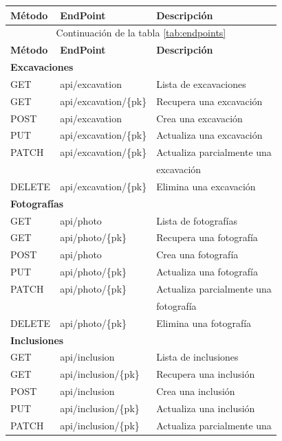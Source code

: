 \begin{longtable}[H]{|l|l|l|}
    \hline
    \textbf{Método} & \textbf{EndPoint} & \textbf{Descripción} \\
    \hline
    \endfirsthead
   
    \hline
    \multicolumn{3}{|c|}{Continuación de la tabla \ref{tab:endpoints}}\\
    \hline
    \textbf{Método} & \textbf{EndPoint} & \textbf{Descripción} \\
    \hline
    \hline
    \endhead
   
    \hline\hline
    \multicolumn{3}{|l|}{\textbf{Excavaciones}} \\
    \hline
    GET & api/excavation & Lista de excavaciones \\
    GET & api/excavation/\{pk\} & Recupera una excavación\\
    POST & api/excavation & Crea una excavación \\
    PUT & api/excavation/\{pk\} & Actualiza una excavación \\
    PATCH & api/excavation/\{pk\} & Actualiza parcialmente una \\
    &  & excavación \\
    DELETE & api/excavation/\{pk\} & Elimina una excavación \\
    \hline\hline
    \multicolumn{3}{|l|}{\textbf{Fotografías}} \\
    \hline
    GET & api/photo & Lista de fotografías \\
    GET & api/photo/\{pk\} & Recupera una fotografía \\
    POST & api/photo & Crea una fotografía \\
    PUT & api/photo/\{pk\} & Actualiza una fotografía \\
    PATCH & api/photo/\{pk\} & Actualiza parcialmente una \\
    &  & fotografía \\
    DELETE & api/photo/\{pk\} & Elimina una fotografía \\
    \hline\hline
    \multicolumn{3}{|l|}{\textbf{Inclusiones}} \\
    \hline
    GET & api/inclusion & Lista de inclusiones \\
    GET & api/inclusion/\{pk\} & Recupera una inclusión \\
    POST & api/inclusion & Crea una inclusión \\
    PUT & api/inclusion/\{pk\} & Actualiza una inclusión\\
    PATCH & api/inclusion/\{pk\} & Actualiza parcialmente una \\

\end{longtable}
